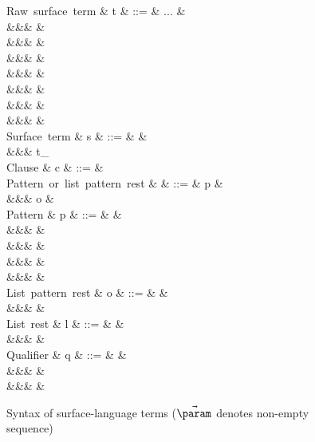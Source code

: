 \begin{figure}[H]
\begin{syntaxfig}
\mbox{Raw surface term}
&
t
&
::=
&
...
&
\\
&&&
&
\\
&&&
&
\\
&&&
&
\\
&&&
&
\\
&&&
&
\\
&&&
&
\\
&&&
&
\\[2mm]

\mbox{Surface term}
&
s
&
::=
&
\hole
&
\\
&&&
t_{\alpha}
\\[2mm]

\mbox{Clause}
&
c
&
::=
&
\\[2mm]

\mbox{Pattern or list pattern rest}
&
\pi
&
::=
&
p
&
\\
&&&
o
&
\\[2mm]

\mbox{Pattern}
&
p
&
::=
&
&
\\
&&&
\pattNil
&
\\
&&&
&
\\
&&&
&
\\
&&&
&
\\[2mm]

\mbox{List pattern rest}
&
o
&
::=
&
\pattSNil
&
\\
&&&
&
\\[2mm]

\mbox{List rest}
&
l
&
::=
&
\annot{\sExNil}{\alpha}
&
\\
&&&
&
\\[2mm]

\mbox{Qualifier}
&
q
&
::=
&
&
\\
&&&
&
\\
&&&
&
\\[2mm]

\end{syntaxfig}
\caption{Syntax of surface-language terms ($\vec{\param}$ denotes non-empty sequence)}
\end{figure}

